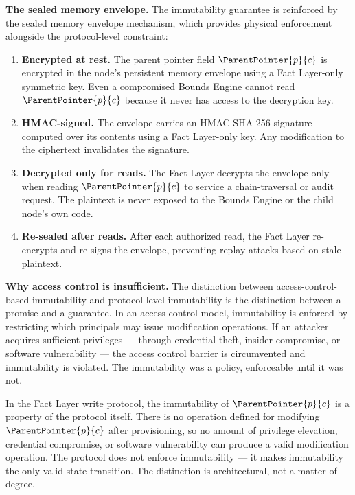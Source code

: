 \medskip
\noindent\textbf{The sealed memory envelope.} The immutability guarantee is reinforced by the sealed memory envelope mechanism, which provides physical enforcement alongside the protocol-level constraint:

\begin{enumerate}
    \item \textbf{Encrypted at rest.} The parent pointer field $\ParentPointer{p}{c}$ is encrypted in the node's persistent memory envelope using a Fact Layer-only symmetric key. Even a compromised Bounds Engine cannot read $\ParentPointer{p}{c}$ because it never has access to the decryption key.

    \item \textbf{HMAC-signed.} The envelope carries an HMAC-SHA-256 signature computed over its contents using a Fact Layer-only key. Any modification to the ciphertext invalidates the signature.

    \item \textbf{Decrypted only for reads.} The Fact Layer decrypts the envelope only when reading $\ParentPointer{p}{c}$ to service a chain-traversal or audit request. The plaintext is never exposed to the Bounds Engine or the child node's own code.

    \item \textbf{Re-sealed after reads.} After each authorized read, the Fact Layer re-encrypts and re-signs the envelope, preventing replay attacks based on stale plaintext.
\end{enumerate}

\medskip
\noindent\textbf{Why access control is insufficient.} The distinction between access-control-based immutability and protocol-level immutability is the distinction between a promise and a guarantee. In an access-control model, immutability is enforced by restricting which principals may issue modification operations. If an attacker acquires sufficient privileges --- through credential theft, insider compromise, or software vulnerability --- the access control barrier is circumvented and immutability is violated. The immutability was a policy, enforceable until it was not.

In the Fact Layer write protocol, the immutability of $\ParentPointer{p}{c}$ is a property of the protocol itself. There is no operation defined for modifying $\ParentPointer{p}{c}$ after provisioning, so no amount of privilege elevation, credential compromise, or software vulnerability can produce a valid modification operation. The protocol does not enforce immutability --- it makes immutability the only valid state transition. The distinction is architectural, not a matter of degree.

